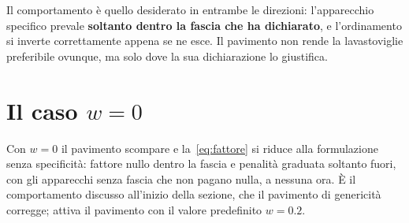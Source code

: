 Il comportamento è quello desiderato in entrambe le direzioni: l'apparecchio specifico prevale
\textbf{soltanto dentro la fascia che ha dichiarato}, e l'ordinamento si inverte correttamente
appena se ne esce. Il pavimento non rende la lavastoviglie preferibile ovunque, ma solo dove la
sua dichiarazione lo giustifica.

\section{Il caso \texorpdfstring{$w = 0$}{w = 0}}

Con $w = 0$ il pavimento scompare e la~\eqref{eq:fattore} si riduce alla formulazione senza
specificità: fattore nullo dentro la fascia e penalità graduata soltanto fuori, con gli apparecchi
senza fascia che non pagano nulla, a nessuna ora. È il comportamento discusso all'inizio della
sezione, che il pavimento di genericità corregge;  attiva il pavimento
con il valore predefinito $w = 0.2$.
